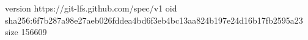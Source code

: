 version https://git-lfs.github.com/spec/v1
oid sha256:6f7b287a98e27aeb026fddea4bd6f3eb4bc13aa824b197e24d16b17fb2595a23
size 156609
